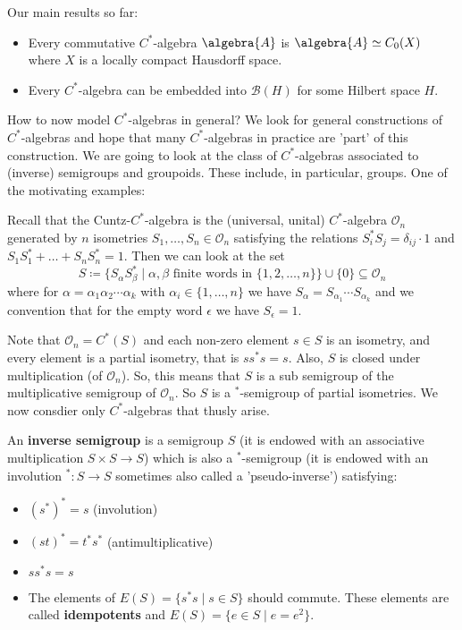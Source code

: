 \documentclass[a4paper]{article}
\begin{document}
Our main results so far:
\begin{itemize}
	\item Every commutative $C^*$-algebra $\algebra{A}$ is $\algebra{A} \simeq C_0(X)$ where $X$ is a locally compact Hausdorff space.
	\item Every $C^*$-algebra can be embedded into $\mathcal{B}(H)$ for some Hilbert space $H$.
\end{itemize}
How to now model $C^*$-algebras in general?
We look for general constructions of $C^*$-algebras and hope that many $C^*$-algebras in practice are 'part' of this construction.
We are going to look at the class of $C^*$-algebras associated to (inverse) semigroups and groupoids.
These include, in particular, groups.
One of the motivating examples:
\begin{example}
	Recall that the Cuntz-$C^*$-algebra is the (universal, unital) $C^*$-algebra  $\mathcal{O}_n$  generated by $n$ isometries $S_1, \dots, S_n \in \mathcal{O}_n$ satisfying the relations $S_i^* S_j = \delta_{ij} \cdot 1$ and $S_1 S_1^* + \dots + S_n S_n^* = 1$.
	Then we can look at the set 
	\begin{equation*}
		S \coloneq \{ S_\alpha S_\beta^* \mid \alpha, \beta \text{ finite words in } \{1, 2, \dots, n\} \} \cup \{0\} \subseteq \mathcal{O}_n
	\end{equation*}
	where for $\alpha = \alpha_1 \alpha_2 \cdots \alpha_k$ with $\alpha_i \in \{1, \dots, n\}$ we have $S_\alpha = S_{\alpha_1} \cdots S_{\alpha_k}$ and we convention that for the empty word $\epsilon$ we have $S_\epsilon = 1$.

	Note that $\mathcal{O}_n = C^*(S)$ and each non-zero element $s \in S$ is an isometry, and every element is a partial isometry, that is $s s^* s = s$.
	Also, $S$ is closed under multiplication (of $\mathcal{O}_n$).
	So, this means that $S$ is a sub semigroup of the multiplicative semigroup of $\mathcal{O}_n$.
	So $S$ is a $^*$-semigroup of partial isometries.
	We now consdier only $C^*$-algebras that thusly arise.
\end{example}

\begin{definition}
	An \textbf{inverse semigroup} is a semigroup $S$ (it is endowed with an associative multiplication $S \times S \to S$) which is also a $^*$-semigroup (it is endowed with an involution $^*: S \to S$ sometimes also called a 'pseudo-inverse') satisfying:
	\begin{itemize}
		\item $(s^*)^*=s$ (involution)
		\item $(st)^* = t^* s^*$ (antimultiplicative)
		\item $s s^* s = s$
		\item The elements of $E(S) = \{s^* s \mid s \in S \}$ should commute.
		These elements are called \textbf{idempotents} and $E(S) = \{e \in S \mid e = e^2 \}$.
	\end{itemize}
\end{definition}
\end{document}
